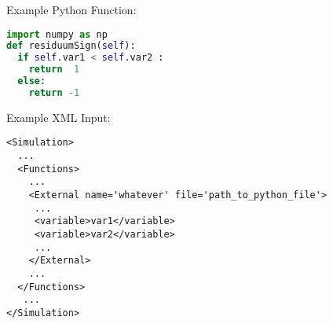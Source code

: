Example Python Function:
\begin{lstlisting}[language=python]
import numpy as np
def residuumSign(self):
  if self.var1 < self.var2 :
    return  1
  else:
    return -1
\end{lstlisting}

Example XML Input:
\begin{lstlisting}[style=XML,morekeywords={name,file}] %moreemph={name,file}]
<Simulation>
  ...
  <Functions>
    ...
    <External name='whatever' file='path_to_python_file'>
     ...
     <variable>var1</variable>
     <variable>var2</variable>
     ...
    </External>
    ...
  </Functions>
   ...
</Simulation>
\end{lstlisting}
